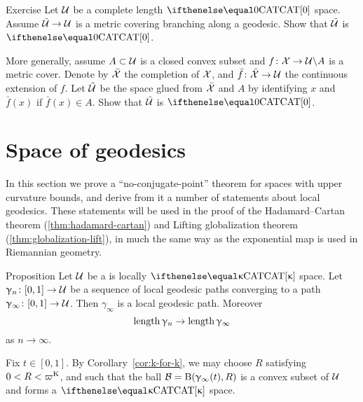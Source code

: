 \begin{thm}{Exercise} Let $\mathcal{U}$ be a complete length $\CAT0$ space.
Assume $\tilde{\spc{U}}\to \spc{U}$ is a metric covering branching along a geodesic.
Show that $\tilde{\mathcal{U}}$ is $\CAT0$.

More generally, assume $A\subset \spc{U}$ is a closed convex subset and $f\:\spc{X}\to \spc{U}\backslash A$ is a metric cover.
Denote by $\bar{\mathcal{X}}$ the completion of $\mathcal{X}$, and 
$\bar f\:\bar{\spc{X}}\to \spc{U}$ the continuous extension of $f$.
Let $\tilde{\mathcal{U}}$ be the space glued from $\bar{\mathcal{X}}$ and $A$ by identifying $x$ and $\bar f(x)$ if $\bar f(x)\in A$.
Show that $\tilde{\mathcal{U}}$ is $\CAT0$.
\end{thm}




\section{Space of geodesics}\label{sec:geod-space}

In this section we prove a  ``no-conjugate-point'' theorem for spaces with upper curvature bounds, and derive from it a number of statements about
local geodesics.  These statements will be used in the proof of the Hadamard--Cartan theorem (\ref{thm:hadamard-cartan}) and Lifting
 globalization theorem (\ref{thm:globalization-lift}), in much the same way as  the exponential map is used in Riemannian geometry.

\begin{thm}{Proposition}\label{prop:geo-complete}
Let $\mathcal{U}$ be a is locally $\CAT\kappa$ space.
 Let $\gamma_n\:[0,1]\to\spc{U}$ be a sequence of local geodesic paths converging to a path $\gamma_\infty\:[0,1]\to\spc{U}$.
Then $\gamma_\infty$ is a local geodesic path.
Moreover 
\[\length\gamma_n\to\length\gamma_\infty\]
as $n\to\infty$.
\end{thm}

Fix $t\in[0,1]$.
By Corollary~\ref{cor:k-for-k}, we may choose $R$ satisfying $0<R<\varpi\Kappa$,
and such that
the ball $\mathcal{B}=\mathrm{B}{}(\upgamma_\infty(t),R)$ is a convex subset of $\mathcal{U}$ and forms a $\CAT\kappa$ space.



